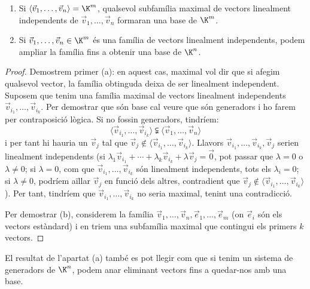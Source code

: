 \begin{proposicio}
	\begin{enumerate}[\rm (a)]
		\item Si $\langle \vec v_1, \dots , \vec v_n \rangle = \K^m$, qualsevol subfamília maximal de vectors linealment independents de $\vec v_1, \dots, \vec v_n$ formaran una base de $\K^m$.
		\item Si $\vec v_1, \dots, \vec v_n \in \K^m$ és una família de vectors linealment independents, podem ampliar la família fins a obtenir una base de $\K^n$.
	\end{enumerate}
\end{proposicio}
\begin{proof}
	Demostrem primer (a): en aquest cas, maximal vol dir que si afegim qualsevol vector, la família obtinguda deixa de ser linealment independent. Suposem que tenim una família maximal de vectors linealment independents $\vec v_{i_1}, \dots ,\vec v_{i_k}$. Per demostrar que són base cal veure que són generadors i ho farem per contraposició lògica. Si no fossin generadors, tindríem:
	$$
	\langle \vec v_{i_1}, \dots ,\vec v_{i_k}\rangle \subsetneqq \langle \vec v_{1}, \dots ,\vec v_{n}\rangle
	$$
	i per tant hi hauria un $\vec v_j$ tal que $\vec v_j \not\in \langle \vec v_{i_1}, \dots ,\vec v_{i_k}\rangle$. Llavors $\vec v_{i_1}, \dots ,\vec v_{i_k}, \vec v_j$ serien linealment independents (si $\lambda_1\vec v_{i_1}+\cdots + \lambda_k\vec v_{i_k}+\lambda \vec v_j=\vec 0$, pot passar que $\lambda=0$ o $\lambda\neq0$; si $\lambda=0$, com que $\vec v_{i_1}, \dots ,\vec v_{i_k}$ són linealment independents, tots els $\lambda_i=0$; si $\lambda\neq 0$, podríem aïllar $\vec v_j$ en funció dels altres, contradient que $\vec v_j \not\in \langle \vec v_{i_1}, \dots ,\vec v_{i_k}\rangle$). Per tant, tindríem que $\vec v_{i_1}, \dots ,\vec v_{i_k}$ no seria maximal, tenint una contradicció.
	
	Per demostrar (b), considerem la família $\vec v_1,\dots,\vec v_n,\vec e_1, \dots, \vec e_m$ (on $\vec e_i$ són els vectors estàndard) i en triem una subfamília maximal que contingui els primers $k$ vectors.
\end{proof}

El resultat de l'apartat (a) també es pot llegir com que si tenim un sistema de generadors de $\K^n$, podem anar eliminant vectors fins a quedar-nos amb una base.

